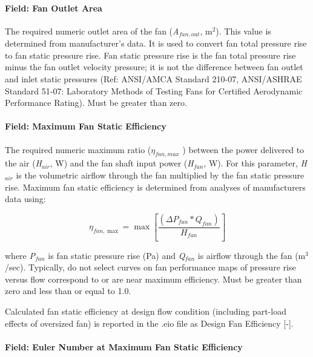 \paragraph{Field: Fan Outlet Area}\label{field-fan-outlet-area}

The required numeric outlet area of the fan (\emph{A\(_{fan,out}\)}, m\(^{2}\)). This value is determined from manufacturer's data. It is used to convert fan total pressure rise to fan static pressure rise. Fan static pressure rise is the fan total pressure rise minus the fan outlet velocity pressure; it is not the difference between fan outlet and inlet static pressures (Ref: ANSI/AMCA Standard 210-07, ANSI/ASHRAE Standard 51-07: Laboratory Methods of Testing Fans for Certified Aerodynamic Performance Rating). Must be greater than zero.

\paragraph{Field: Maximum Fan Static Efficiency}\label{field-maximum-fan-static-efficiency}

The required numeric maximum ratio (\(\eta_{fan,max}\) ) between the power delivered to the air (\emph{H\(_{air}\)}, W) and the fan shaft input power (\emph{H\(_{fan}\)}, W). For this parameter, \emph{H\(_{air}\)} is the volumetric airflow through the fan multiplied by the fan static pressure rise. Maximum fan static efficiency is determined from analyses of manufacturers data using:

\begin{equation}
{\eta_{fan,\max }} = \max \left[ {\frac{{\left( {\Delta {P_{fan}} * {Q_{fan}}} \right)}}{{{H_{fan}}}}} \right]
\end{equation}

where \emph{P\(_{fan}\)} is fan static pressure rise (Pa) and \emph{Q\(_{fan}\)} is airflow through the fan (m\(^{3}\)/sec). Typically, do not select curves on fan performance maps of pressure rise versus flow correspond to or are near maximum efficiency. Must be greater than zero and less than or equal to 1.0.

Calculated fan static efficiency at design flow condition (including part-load effects of oversized fan) is reported in the .eio file as Design Fan Efficiency {[}-{]}.

\paragraph{Field: Euler Number at Maximum Fan Static Efficiency}\label{field-euler-number-at-maximum-fan-static-efficiency}

